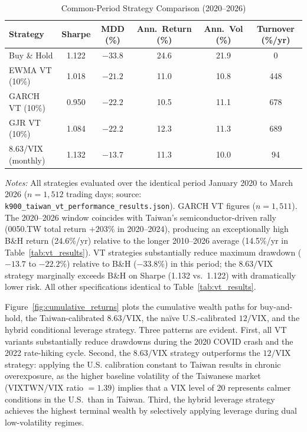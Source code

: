 \begin{table}[H]
\centering
\caption{Common-Period Strategy Comparison (2020--2026)}
\label{tab:vt_common}
\begin{tabular}{lccccc}
\toprule
Strategy & Sharpe & MDD (\%) & Ann.\ Return (\%) & Ann.\ Vol (\%) & Turnover (\%/yr) \\
\midrule
Buy \& Hold & 1.122 & $-33.8$ & 24.6 & 21.9 & 0 \\ %
EWMA VT (10\%) & 1.018 & $-21.2$ & 11.0 & 10.8 & 448 \\ %
GARCH VT (10\%) & 0.950 & $-22.2$ & 10.5 & 11.1 & 678 \\ %
GJR VT (10\%) & 1.084 & $-22.2$ & 12.3 & 11.3 & 689 \\ %
8.63/VIX (monthly) & 1.132 & $-13.7$ & 11.3 & 10.0 & 94 \\ %
\bottomrule
\end{tabular}
\begin{flushleft}
\small \textit{Notes:} All strategies evaluated over the identical period January 2020 to March 2026 ($n = 1{,}512$ trading days; source: \texttt{k900\_taiwan\_vt\_performance\_results.json}). GARCH VT figures ($n = 1{,}511$). The 2020--2026 window coincides with Taiwan's semiconductor-driven rally (0050.TW total return $+203\%$ in 2020--2024), producing an exceptionally high B\&H return (24.6\%/yr) relative to the longer 2010--2026 average (14.5\%/yr in Table~\ref{tab:vt_results}). VT strategies substantially reduce maximum drawdown ($-13.7$ to $-22.2\%$) relative to B\&H ($-33.8\%$) in this period; the $8.63/\text{VIX}$ strategy marginally exceeds B\&H on Sharpe (1.132 vs.\ 1.122) with dramatically lower risk. All other specifications identical to Table~\ref{tab:vt_results}.
\end{flushleft}
\end{table}

Figure~\ref{fig:cumulative_returns} plots the cumulative wealth paths for buy-and-hold, the Taiwan-calibrated $8.63/\text{VIX}$, the na\"ive U.S.-calibrated $12/\text{VIX}$, and the hybrid conditional leverage strategy. Three patterns are evident. First, all VT variants substantially reduce drawdowns during the 2020 COVID crash and the 2022 rate-hiking cycle. Second, the $8.63/\text{VIX}$ strategy outperforms the $12/\text{VIX}$ strategy: applying the U.S. calibration constant to Taiwan results in chronic overexposure, as the higher baseline volatility of the Taiwanese market (VIXTWN/VIX ratio $= 1.39$) implies that a VIX level of 20 represents calmer conditions in the U.S.\ than in Taiwan. Third, the hybrid leverage strategy achieves the highest terminal wealth by selectively applying leverage during dual low-volatility regimes.

